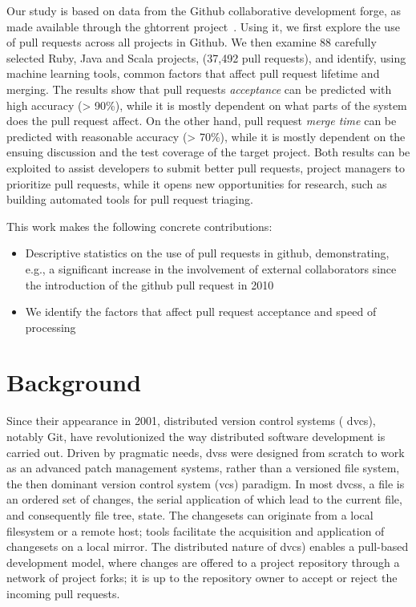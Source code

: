 \documentclass{sig-alternate}
\begin{document}
Our study is based on data from the Github collaborative development forge, as
made available through the {\sc ght}orrent project~\cite{GS12}. Using it, we first
explore the use of pull requests across all projects in Github.  We then examine
88 carefully selected Ruby, Java and Scala projects, (37,492 pull requests), and
identify, using machine learning tools, common factors that affect pull request
lifetime and merging. The results show that pull requests \emph{acceptance}
can be predicted with high accuracy (> 90\%), while it is mostly dependent on
what parts of the system does the pull request affect.  On the other hand, pull
request \emph{merge time} can be predicted with reasonable accuracy (> 70\%),
while it is mostly dependent on the ensuing discussion and the test coverage of
the target project.  Both results can be exploited to assist developers to
submit better pull requests, project managers to prioritize pull requests, while
it opens new opportunities for research, such as building automated tools for
pull request triaging.

This work makes the following concrete contributions:

\begin{itemize}

  \item Descriptive statistics on the use of pull requests in github, demonstrating, e.g., a significant increase in the involvement of external collaborators since the introduction of the github pull request in 2010 

  \item We identify the factors that affect pull request acceptance and
    speed of processing

\end{itemize}


\section{Background}

Since their appearance in 2001, distributed version control systems ({\sc
dvcs}), notably Git, have revolutionized the way distributed software
development is carried out. Driven by pragmatic needs, {\sc dvs}s were designed
from scratch to work as an advanced patch management systems, rather than a
versioned file system, the then dominant version control system ({\sc vcs})
paradigm. In most {\sc dvcs}s, a file is an ordered set of changes, the serial
application of which lead to the current file, and consequently file tree,
state. The changesets can originate from a local filesystem or a remote host;
tools facilitate the acquisition and application of changesets on a local
mirror. The distributed nature of {\sc dvcs}) enables a pull-based development
model, where changes are offered to a project repository through a network of
project forks; it is up to the repository owner to accept or reject the incoming
pull requests.
\end{document}
